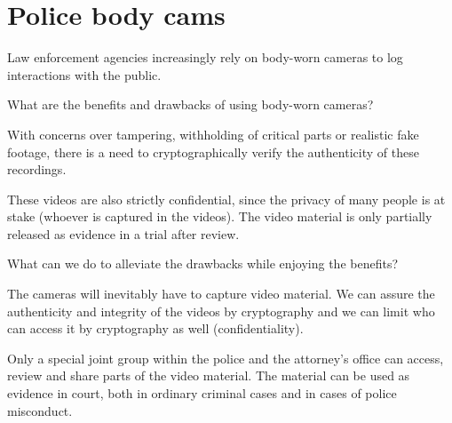 \chapter{Police body cams}\label{PoliceCamStatement}

Law enforcement agencies increasingly rely on body-worn cameras to log 
interactions with the public.

\begin{exercise}\label{BenefitsDrawbacks}
  What are the benefits and drawbacks of using body-worn cameras?
\end{exercise}

With concerns over tampering, withholding of critical parts or realistic fake 
footage, there is a need to cryptographically verify the authenticity of these 
recordings.

These videos are also strictly confidential, since the privacy of many
people is at stake (whoever is captured in the videos).
The video material is only partially released as evidence in a trial after 
review.

\begin{exercise}\label{AlleviateDrawbacks}
  What can we do to alleviate the drawbacks while enjoying the benefits?
\end{exercise}

The cameras will inevitably have to capture video material.
We can assure the authenticity and integrity of the videos by cryptography and 
we can limit who can access it by cryptography as well (confidentiality).

Only a special joint group within the police and the attorney's office can 
access, review and share parts of the video material.
The material can be used as evidence in court, both in ordinary criminal cases 
and in cases of police misconduct.

